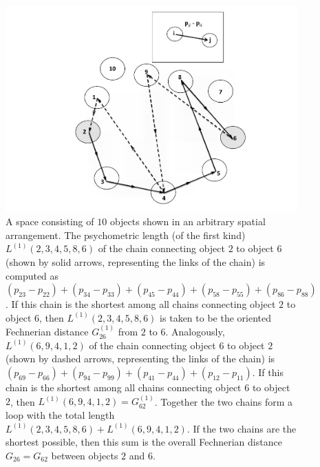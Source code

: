 \documentclass[nojss]{jss}
\begin{document}
\begin{figure}[t!]
\begin{center}
\includegraphics[scale=1]{fig1.pdf}
\caption{A space consisting of $10$ objects shown in an arbitrary spatial
arrangement. The psychometric length (of the first kind) $L^{(1)}\left(2,3,4,5,8,6\right)$
of the chain connecting object $2$ to object $6$ (shown by solid arrows, representing the links of the chain)
is computed as $\left(p_{23}-p_{22}\right)+\left(p_{34}-p_{33}\right)+\left(p_{45}-p_{44}\right)+\left(p_{58}-p_{55}\right)+\left(p_{86}-p_{88}\right)$.
If this chain is the shortest among all chains connecting object $2$
to object $6$, then $L^{(1)}\left(2,3,4,5,8,6\right)$ is
taken to be the oriented Fechnerian distance $G_{26}^{(1)}$ from
$2$ to $6$. Analogously, $L^{(1)}\left(6,9,4,1,2\right)$ of
the chain connecting object $6$ to object $2$ (shown by dashed arrows, representing the links of the chain)
is $\left(p_{69}-p_{66}\right)+\left(p_{94}-p_{99}\right)+\left(p_{41}-p_{44}\right)+\left(p_{12}-p_{11}\right)$.
If this chain is the shortest among all chains connecting object $6$
to object $2$, then $L^{(1)}\left(6,9,4,1,2\right)=G_{62}^{(1)}$.
Together the two chains form a loop with the total length $L^{(1)}\left(2,3,4,5,8,6\right)+L^{(1)}\left(6,9,4,1,2\right)$.
If the two chains are the shortest possible, then this sum is the
overall Fechnerian distance $G_{26}=G_{62}$ between objects $2$ and $6$.}
\label{fig:1}
\end{center}
\end{figure}  
\end{document}
